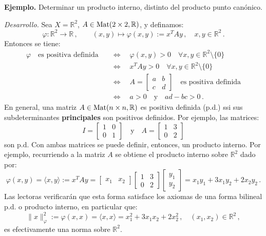 \medskip\noindent
\textbf{Ejemplo.}
Determinar un producto interno, distinto del producto punto can\'onico.

\smallskip\noindent
\emph{Desarrollo.}
Sea $X=\mathbb{R}^2$, $A\in{\rm Mat}(2\times 2,\mathbb{R})$, y definamos:
\begin{equation*}
\varphi: \mathbb{R}^2 \rightarrow \mathbb{R}\,,\qquad
(x,y)\mapsto \varphi(x,y):= x^{T}Ay\,,\quad x,y\in\mathbb{R}^2\,.
\end{equation*}
Entonces se tiene:
\begin{align*}
\varphi\quad\text{es positiva definida}\quad
& \Leftrightarrow\quad \varphi(x,y)> 0\quad
  \forall x,y\in\mathbb{R}^2\setminus\{0\} \\
& \Leftrightarrow\quad x^{T}Ay> 0\quad
  \forall x,y\in\mathbb{R}^2\setminus\{0\}\quad \\
& \Leftrightarrow\quad 
  A=\begin{bmatrix} a & b \\ c & d \end{bmatrix}\quad
  \text{es positiva definida} \\
& \Leftrightarrow\quad 
  a>0\quad\text{y}\quad ad-bc>0\,.
\end{align*}
En general, una matriz $A\in{\rm Mat}(n\times n,\mathbb{R})$
es positiva definida (p.d.) ssi sus subdeterminantes
{\color{red}\bf principales} son positivos definidos.
Por ejemplo, las matrices:
$$
I=\begin{bmatrix} 1 & 0 \\ 0 & 1 \end{bmatrix}
\quad\text{y}\quad 
A=\begin{bmatrix} 1 & 3 \\ 0 & 2 \end{bmatrix}
$$
son p.d.
Con ambas matrices se puede definir, entonces, un producto interno.
Por ejemplo, recurriendo a la matriz $A$ se obtiene el producto interno
sobre $\mathbb{R}^2$ dado por:
$$
\varphi(x,y) = \langle x,y\rangle := x^{T}Ay
= \begin{bmatrix} x_1 & x_2 \end{bmatrix}
  \begin{bmatrix} 1 & 3 \\ 0 & 2 \end{bmatrix}
  \begin{bmatrix} y_1 \\ y_2 \end{bmatrix}
= x_1y_1 + 3x_1 y_2 + 2 x_2 y_2\,.
$$
Las lectoras verificar\'an que esta forma satisface los axiomas de una
forma bilineal p.d. o producto interno, en particular que:
$$
\|x\|_\varphi^2 := \varphi(x,x) = \langle x,x\rangle
= x_1^2 + 3x_1 x_2 + 2 x_2^2\,,\quad (x_1,x_2)\in\mathbb{R}^2\,,
$$
es efectivamente una norma sobre $\mathbb{R}^2$.


